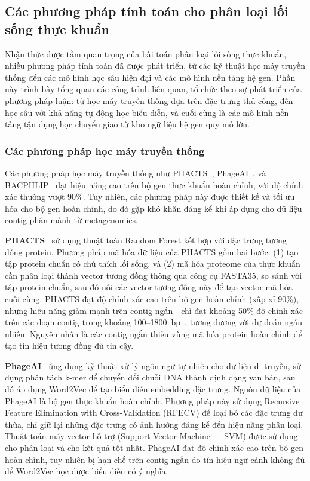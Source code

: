 \subsection{Các phương pháp tính toán cho phân loại lối sống thực khuẩn}
\label{subsec:phage_classification_methods}

Nhận thức được tầm quan trọng của bài toán phân loại lối sống thực khuẩn, nhiều phương pháp tính toán đã được phát triển, từ các kỹ thuật học máy truyền thống đến các mô hình học sâu hiện đại và các mô hình nền tảng hệ gen. Phần này trình bày tổng quan các công trình liên quan, tổ chức theo sự phát triển của phương pháp luận: từ học máy truyền thống dựa trên đặc trưng thủ công, đến học sâu với khả năng tự động học biểu diễn, và cuối cùng là các mô hình nền tảng tận dụng học chuyển giao từ kho ngữ liệu hệ gen quy mô lớn.

\subsubsection{Các phương pháp học máy truyền thống}

Các phương pháp học máy truyền thống như PHACTS~\cite{mcnair2012phacts}, PhageAI~\cite{tynecki2020phageai}, và BACPHLIP~\cite{hockenberry2021bacphlip} đạt hiệu năng cao trên bộ gen thực khuẩn hoàn chỉnh, với độ chính xác thường vượt 90\%. Tuy nhiên, các phương pháp này được thiết kế và tối ưu hóa cho bộ gen hoàn chỉnh, do đó gặp khó khăn đáng kể khi áp dụng cho dữ liệu contig phân mảnh từ metagenomics.

\textbf{PHACTS}~\cite{mcnair2012phacts} sử dụng thuật toán Random Forest kết hợp với đặc trưng tương đồng protein. Phương pháp mã hóa dữ liệu của PHACTS gồm hai bước: (1) tạo tập protein chuẩn có chú thích lối sống, và (2) mã hóa proteome của thực khuẩn cần phân loại thành vector tương đồng thông qua công cụ FASTA35, so sánh với tập protein chuẩn, sau đó nối các vector tương đồng này để tạo vector mã hóa cuối cùng. PHACTS đạt độ chính xác cao trên bộ gen hoàn chỉnh (xấp xỉ 90\%), nhưng hiệu năng giảm mạnh trên contig ngắn---chỉ đạt khoảng 50\% độ chính xác trên các đoạn contig trong khoảng 100--1800~bp~\cite{wu2021deephage}, tương đương với dự đoán ngẫu nhiên. Nguyên nhân là các contig ngắn thiếu vùng mã hóa protein hoàn chỉnh để tạo tín hiệu tương đồng đủ tin cậy.

\textbf{PhageAI}~\cite{tynecki2020phageai} ứng dụng kỹ thuật xử lý ngôn ngữ tự nhiên cho dữ liệu di truyền, sử dụng phân tách k-mer để chuyển đổi chuỗi DNA thành định dạng văn bản, sau đó áp dụng Word2Vec để tạo biểu diễn embedding đặc trưng. Nguồn dữ liệu của PhageAI là bộ gen thực khuẩn hoàn chỉnh. Phương pháp này sử dụng Recursive Feature Elimination with Cross-Validation (RFECV) để loại bỏ các đặc trưng dư thừa, chỉ giữ lại những đặc trưng có ảnh hưởng đáng kể đến hiệu năng phân loại. Thuật toán máy vector hỗ trợ (Support Vector Machine --- SVM) được sử dụng cho phân loại và cho kết quả tốt nhất. PhageAI đạt độ chính xác cao trên bộ gen hoàn chỉnh, tuy nhiên bị hạn chế trên contig ngắn do tín hiệu ngữ cảnh không đủ để Word2Vec học được biểu diễn có ý nghĩa.

